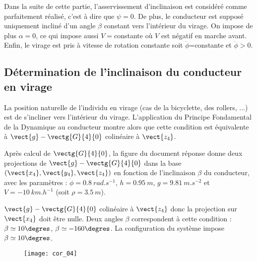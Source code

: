 
Dans la suite de cette partie, l’asservissement d’inclinaison est considéré comme parfaitement réalisé, c’est à dire que $\psi = 0$. De plus, le conducteur est supposé uniquement incliné d’un angle $\beta$ constant vers l’intérieur du virage. On impose de plus $\alpha=0$, ce qui impose aussi  $V=$constante où $V$ est négatif en marche avant. Enfin, le virage est pris à vitesse de rotation constante soit $\dot{\phi}$=constante et $\dot{\phi}>0$.

  \fi
  
\subsection{Détermination de l’inclinaison du conducteur en virage}

\ifprof
\else

La position naturelle de l’individu en virage (cas de la bicyclette, des rollers, ...) est de s’incliner vers l’intérieur du virage. L’application du Principe Fondamental de la Dynamique au conducteur montre alors que cette condition est équivalente à $\vect{g}-\vectg{G}{4}{0}$ colinéaire à $\vect{z_4}$.

Après calcul de $\vectg{G}{4}{0}$, la figure du document réponse donne deux projections de $\vect{g}-\vectg{G}{4}{0}$ dans la base $\left(\vect{x_4},\vect{y_4},\vect{z_4} \right)$ en fonction de l’inclinaison $\beta$ du conducteur, avec les paramètres : 
$\dot{\phi}=\SI{0,8}{rad.s^{-1}}$, 
$h=\SI{0,95}{m}$, 
$g=\SI{9,81}{m.s^{-2}}$ et 
$V=-\SI{10}{km.h^{-1}}$ (soit $\rho = \SI{3,5}{m}$).

\fi

\ifprof
\begin{corrige}
$\vect{g}-\vectg{G}{4}{0}$ colinéaire à $\vect{z_4}$ donc la projection sur $\vect{x_4}$ doit être nulle.
Deux angles $\beta$ correspondent à cette condition : $\beta\simeq 10\degres$, $\beta\simeq -160\degres$. La configuration du système impose $\beta\simeq 10\degres$.



\begin{figure}[H]
\centering
\texttt{[image: cor\_04]}
\end{figure}
\end{corrige}
\else
\fi


